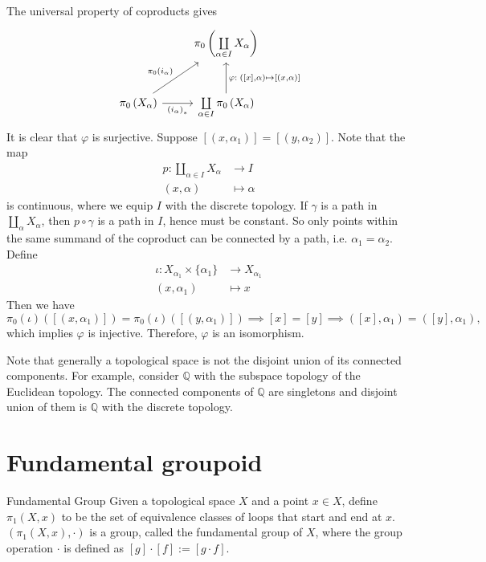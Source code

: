 \documentclass{report}
\begin{document}
\begin{prf}
	The universal property of coproducts gives
	\[
		\begin{tikzcd}[ampersand replacement=\&]
			\& \pi_0\left(\coprod\limits_{\alpha\in I} X_\alpha\right) \\ [10pt]
			\pi_0\left(X_\alpha\right) \arrow[ru, "\pi_0\left(i_\alpha\right)"] \arrow[r, "\left(i_\alpha \right)_{*}"']
			\& \coprod\limits_{\alpha\in I} \pi_0\left(X_\alpha\right)
			\arrow[u, "\varphi:\;\left({[x],}\alpha\right)\mapsto{[(x,\alpha)]}"']
		\end{tikzcd}
	\]
	It is clear that $\varphi$ is surjective. Suppose $[(x,\alpha_1)]=[(y,\alpha_2)]$. Note that the map
	\begin{align*}
		p: \coprod_{\alpha\in I} X_\alpha & \longrightarrow I  \\
		(x, \alpha)                       & \longmapsto \alpha
	\end{align*}
	is continuous, where we equip $I$ with the discrete topology. If $\gamma$ is a path in $\coprod_\alpha X_\alpha$, then $p\circ\gamma$ is a path in $I$, hence must be constant. So only points within the same summand of the coproduct can be connected by a path, i.e. $\alpha_1=\alpha_2$. Define
	\begin{align*}
		\iota: X_{\alpha_1} \times\{\alpha_1\} & \longrightarrow  X_{\alpha_1} \\
		(x, \alpha_1)                          & \longmapsto x
	\end{align*}
	Then we have
	\[
		\pi_0(\iota)\left([(x,\alpha_1)]\right)=\pi_0(\iota)\left([(y,\alpha_1)]\right)\implies [x]=[y]\implies ([x],\alpha_1)=([y],\alpha_1),
	\]
	which implies $\varphi$ is injective. Therefore, $\varphi$ is an isomorphism.
\end{prf}

Note that generally a topological space is not the disjoint union of its connected components. For example, consider $\mathbb{Q}$ with the subspace topology of the Euclidean topology. The connected components of $\mathbb{Q}$ are singletons and disjoint union of them is $\mathbb{Q}$ with the discrete topology.

\section{Fundamental groupoid}
\begin{definition}{Fundamental Group}{}
	Given a topological space $X$ and a point $x\in X$, define $\pi_1(X, x)$ to be the set of equivalence classes of loops that start and end at $x$. $(\pi_1(X, x),\cdot)$ is a group, called the fundamental group of $X$, where the group operation $\cdot$ is defined as $[g]\cdot[f]:=[g\cdot f]$.
\end{definition}
\end{document}
